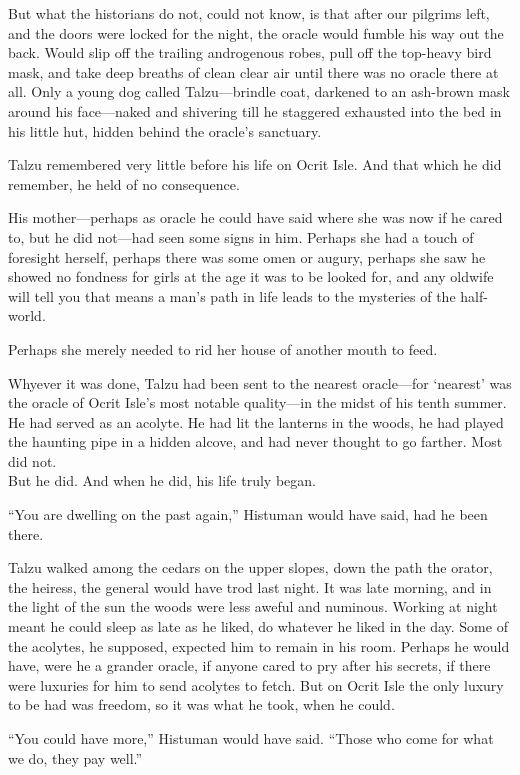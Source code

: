 But what the historians do not, could not know, is that after our pilgrims left, and the doors were locked for the night, the oracle would fumble his way out the back. Would slip off the trailing androgenous robes, pull off the top-heavy bird mask, and take deep breaths of clean clear air until there was no oracle there at all. Only a young dog called Talzu---brindle coat, darkened to an ash-brown mask around his face---naked and shivering till he staggered exhausted into the bed in his little hut, hidden behind the oracle's sanctuary.

Talzu remembered very little before his life on Ocrit Isle. And that which he did remember, he held of no consequence.

His mother---perhaps as oracle he could have said where she was now if he cared to, but he did not---had seen some signs in him. Perhaps she had a touch of foresight herself, perhaps there was some omen or augury, perhaps she saw he showed no fondness for girls at the age it was to be looked for, and any oldwife will tell you that means a man's path in life leads to the mysteries of the half-world.

Perhaps she merely needed to rid her house of another mouth to feed.

Whyever it was done, Talzu had been sent to the nearest oracle---for `nearest' was the oracle of Ocrit Isle's most notable quality---in the midst of his tenth summer. He had served as an acolyte. He had lit the lanterns in the woods, he had played the haunting pipe in a hidden alcove, and had never thought to go farther. Most did not.\\
But he did. And when he did, his life truly began.

``You are dwelling on the past again,'' Histuman would have said, had he been there.

Talzu walked among the cedars on the upper slopes, down the path the orator, the heiress, the general would have trod last night. It was late morning, and in the light of the sun the woods were less aweful and numinous. Working at night meant he could sleep as late as he liked, do whatever he liked in the day. Some of the acolytes, he supposed, expected him to remain in his room. Perhaps he would have, were he a grander oracle, if anyone cared to pry after his secrets, if there were luxuries for him to send acolytes to fetch. But on Ocrit Isle the only luxury to be had was freedom, so it was what he took, when he could.

``You could have more,'' Histuman would have said. ``Those who come for what we do, they pay well.''

